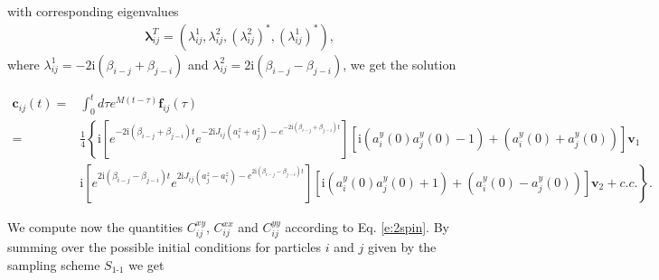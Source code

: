 \documentclass[aps,prl,showpacs,amsmath,amssymb,superscriptaddress,reprint,10pt]{revtex4-1}
\newcommand\ii{{\mathrm{i}}}
\newcommand{\mvec}[1]{\boldsymbol #1}
\begin{document}
with corresponding eigenvalues
\begin{subequations}
\begin{align}
&\mvec{\lambda_{ij}}^T=(\lambda_{ij}^1,\lambda_{ij}^2,(\lambda_{ij}^2)^*,(\lambda_{ij}^1)^*),
\end{align}
\end{subequations}
where $\lambda_{ij}^1=-2\ii (\beta_{i-j}+\beta_{j-i})$ and $\lambda_{ij}^2=2\ii (\beta_{i-j}-\beta_{j-i})$,
we get the solution
\begin{widetext}
\begin{subequations}
\begin{align}
 \mvec{c_{ij}}(t)=&\int_0^t d\tau e^{M(t-\tau)}\mvec{f_{ij}}(\tau)\\
=&\frac{1}{4}\left\lbrace \ii\left[e^{-2\ii (\beta_{i-j}+\beta_{j-i})t}e^{-2\ii J_{ij}(a_i^z+a_j^z)-e^{-2\ii (\beta_{i-j}+\beta_{j-i})t}}\right]\left[\ii (a_i^y(0)a_j^y(0)-1)+(a_i^y(0)+a_j^y(0))\right]\mvec{v_1}\right.\nonumber\\
 &\left. \ii \left[e^{2\ii (\beta_{i-j}-\beta_{j-i})t}e^{2\ii J_{ij}(a_j^z-a_i^z)-e^{2\ii (\beta_{i-j}-\beta_{j-i})t}}\right]\left[\ii (a_i^y(0)a_j^y(0)+1)+(a_i^y(0)-a_j^y(0))\right]\mvec{v_2}+c.c.\right\rbrace.
\end{align}
\end{subequations}
\end{widetext}
We compute now the quantities $C_{ij}^{xy}$, $C_{ij}^{xx}$ and $C_{ij}^{yy}$ according to Eq. \eqref{e:2spin}. By summing over the possible initial conditions for particles $i$ and $j$ given by the sampling scheme $S_{\text{1-1}}$ we get
\end{document}
